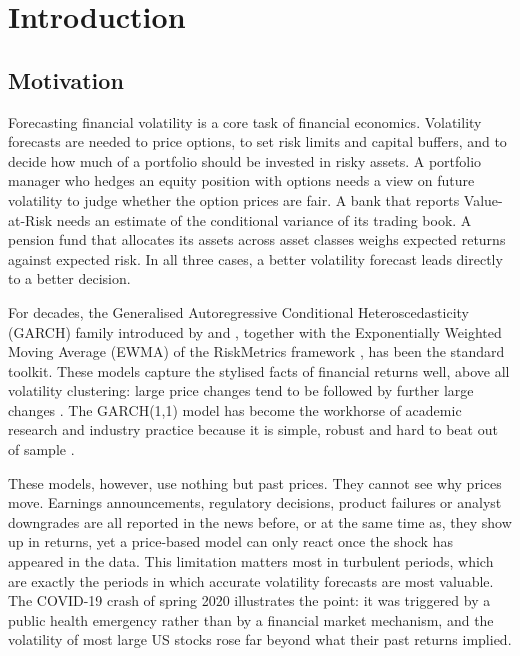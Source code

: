 \documentclass[12pt,a4paper]{article}
\begin{document}
\section{Introduction}\label{sec:introduction}

\subsection{Motivation}\label{sec:motivation}
Forecasting financial volatility is a core task of financial economics. Volatility forecasts are needed to price options, to set risk limits and capital buffers, and to decide how much of a portfolio should be invested in risky assets. A portfolio manager who hedges an equity position with options needs a view on future volatility to judge whether the option prices are fair. A bank that reports Value-at-Risk needs an estimate of the conditional variance of its trading book. A pension fund that allocates its assets across asset classes weighs expected returns against expected risk. In all three cases, a better volatility forecast leads directly to a better decision.

For decades, the Generalised Autoregressive Conditional Heteroscedasticity (GARCH) family introduced by \textcite{engle1982} and \textcite{bollerslev1986}, together with the Exponentially Weighted Moving Average (EWMA) of the RiskMetrics framework \parencite{riskmetrics1996}, has been the standard toolkit. These models capture the stylised facts of financial returns well, above all volatility clustering: large price changes tend to be followed by further large changes \parencite{mandelbrot1963,cont2001}. The GARCH(1,1) model has become the workhorse of academic research and industry practice because it is simple, robust and hard to beat out of sample \parencite{hansen2005}.

These models, however, use nothing but past prices. They cannot see why prices move. Earnings announcements, regulatory decisions, product failures or analyst downgrades are all reported in the news before, or at the same time as, they show up in returns, yet a price-based model can only react once the shock has appeared in the data. This limitation matters most in turbulent periods, which are exactly the periods in which accurate volatility forecasts are most valuable. The COVID-19 crash of spring 2020 illustrates the point: it was triggered by a public health emergency rather than by a financial market mechanism, and the volatility of most large US stocks rose far beyond what their past returns implied.
\end{document}
